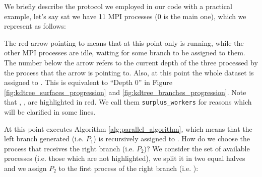 \documentclass{article}
\begin{document}
We briefly describe the protocol we employed in our code with a practical
example, let's say sat we have 11 MPI processes (0 is the main one), which we
represent as follows:

\begin{figure}[H]
    \centering
\end{figure}

The red arrow pointing to  means that at this point only  is
running, while the other MPI processes are idle, waiting for some branch to be
assigned to them. The number below the arrow refers to the current depth of the
three processed by the process that the arrow is pointing to. Also, at this
point the whole dataset is assigned to . This is equivalent to
``Depth 0'' in Figure \ref{fig:kdtree_surfaces_progression} and
\ref{fig:kdtree_branches_progression}. Note that , , 
are highlighted in red. We call them \texttt{surplus\_workers} for reasons which
will be clarified in some lines.

At this point  executes Algorithm \ref{alg:parallel_algorithm},
which means that the left branch generated (i.e. $P_1$) is recursively assigned
to . How do we choose the process that receives the right branch (i.e.
$P_2$)? We consider the set of available processes (i.e. those which are not
highlighted), we split it in two equal halves and we assign $P_2$ to the first
process of the right branch (i.e. ):

\begin{figure}[H]
    \centering
\end{figure}
\end{document}
